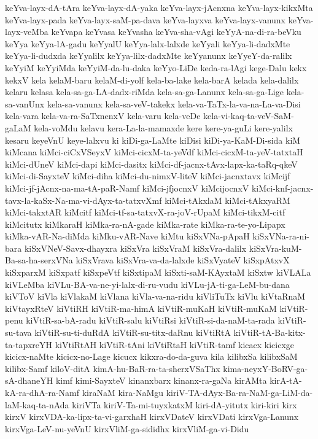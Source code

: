 {keYva-layx-dA-tAra
keYva-layx-dA-yaka
keYva-layx-jAcnxna
keYva-layx-kikxMta
keYva-layx-pada
keYva-layx-saM-pa-dava
keYva-layxva
keYva-layx-vanunx
keYva-layx-veMba
keYvapa
keYvasa
keYvasha
keYva-sha-vAgi
keYyA-na-di-ra-beVku
keYya
keYya-lA-gadu
keYyalU
keYya-lalx-lalxde
keYyali
keYya-li-dadxMte
keYya-li-dudxda
keYyalilx
keYya-lilx-dadxMte
keYyanunx
keYyeY-da-ralilx
keYyiM
keYyiMda
keYyiM-da-lu-daka
keYyo-LiDe
keda-ra-lAgi
kege-Dalu
kekx
kekxV
kela
kelaM-baru
kelaM-di-yolf
kela-ba-lake
kela-barA
kelada
kela-dalilx
kelaru
kelasa
kela-sa-ga-LA-dadx-riMda
kela-sa-ga-Lanunx
kela-sa-ga-Lige
kela-sa-vanUnx
kela-sa-vanunx
kela-sa-veV-takekx
kela-va-TaTx-la-va-na-La-va-Disi
kela-vara
kela-va-ra-SaTxnenxV
kela-varu
kela-veDe
kela-vi-kaq-ta-veV-SaM-gaLaM
kela-voMdu
kelavu
kera-La-la-mamaxde
kere
kere-ya-guLi
kere-yalilx
kesaru
keyeVnU
keye-lalxvu
ki
kiDi-ga-LaMte
kiDisi
kiDi-ya-KaM-Di-sida
kiM
kiMcana
kiMci-ciCxVSeyxV
kiMci-cicxM-ta-yeVdf
kiMci-cicxM-ta-yeV-tatxtaH
kiMci-dUneV
kiMci-dapi
kiMci-dasitx
kiMci-df-jacnx-tAvx-lapx-ka-taRq-qkeV
kiMci-di-SayxteV
kiMci-diha
kiMci-du-nimxV-liteV
kiMci-jacnxtavx
kiMcijf
kiMci-jf-jAcnx-na-ma-tA-paR-Namf
kiMci-jfjocnxV
kiMcijocnxV
kiMci-knf-jacnx-tavx-la-kaSx-Na-ma-vi-dAyx-ta-tatxvXmf
kiMci-tAkxlaM
kiMci-tAkxyaRM
kiMci-takxtAR
kiMcitf
kiMci-tf-sa-tatxvX-ra-joV-rUpaM
kiMci-tikxM-citf
kiMcitutx
kiMkaraH
kiMka-ra-nA-gade
kiMka-rate
kiMka-ra-te-yo-Lipapx
kiMka-vAR-Na-diMda
kiMku-vAR-Nave
kiMtu
kiSxVNa-pApaH
kiSxVNa-ra-ni-bara
kiSxVNeV-Savx-dhayxra
kiSxVra
kiSxVraM
kiSxVra-dalilx
kiSxVra-kuM-Ba-sa-ha-serxVNa
kiSxVrava
kiSxVra-va-da-lalxde
kiSxVyateV
kiSxpAtxvX
kiSxparxM
kiSxpatf
kiSxpeVtf
kiSxtipaM
kiSxti-saM-KAyxtaM
kiSxtw
kiVLALa
kiVLeMba
kiVLu-BA-va-ne-yi-lalx-di-ru-vudu
kiVLu-jA-ti-ga-LeM-bu-dana
kiVToV
kiVla
kiVlakaM
kiVlana
kiVla-va-na-ridu
kiVliTuTx
kiVlu
kiVtaRnaM
kiVtayxRteV
kiVtiRH
kiVtiR-ma-himA
kiVtiR-muKaH
kiVtiR-muKaM
kiVtiR-penu
kiVtiR-sa-bA-radu
kiVtiR-salu
kiVtiRsi
kiVtiR-si-da-naM-ta-rada
kiVtiR-su-tava
kiVtiR-su-ti-duRdA
kiVtiR-su-titx-daRnu
kiVtiRtA
kiVtiR-tA-Ba-kitx-ta-tapxreYH
kiVtiRtAH
kiVtiR-tAni
kiVtiRtaH
kiVtiR-tamf
kicacx
kicicxge
kicicx-naMte
kicicx-no-Lage
kicucx
kikxra-do-da-guva
kila
kilibxSa
kilibxSaM
kilibx-Samf
kiloV-ditA
kimA-hu-BaR-ra-ta-sherxVSaThx
kima-neyxY-BoRV-ga-sA-dhaneYH
kimf
kimi-SayxteV
kinanxbarx
kinanx-ra-gaNa
kirAMta
kirA-tA-kA-ra-dhA-ra-Namf
kiraNaM
kira-NaMgu
kiriV-TA-dAyx-Ba-ra-NaM-ga-LiM-da-laM-kaq-ta-nAda
kiriVTa
kiriV-Ta-mi-tuyxkatxM
kiri-dA-yitutx
kiri-kiri
kirx
kirxV
kirxVDA-ka-lipx-ta-vi-garxhaH
kirxVDateV
kirxVDati
kirxVga-Lanunx
kirxVga-LeV-nu-yeVnU
kirxVliM-ga-sididhx
kirxVliM-ga-vi-Didu
}
